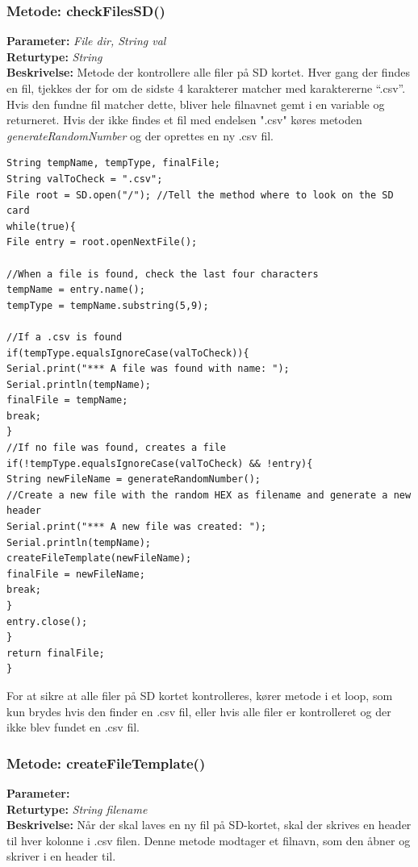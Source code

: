 \subsubsection{Metode: checkFilesSD()} \label{title:checkFiles}
\textbf{Parameter: } \textit{File dir, String val}
\\ \textbf{Returtype: } \textit{String}
\\ \textbf{Beskrivelse: }  Metode der kontrollere alle filer på SD kortet. Hver gang der findes en fil, tjekkes der for om de sidste 4 karakterer matcher med karaktererne “.csv”. Hvis den fundne fil matcher dette, bliver hele filnavnet gemt i en variable og returneret. Hvis der ikke findes et fil med endelsen ".csv" køres metoden \textit{generateRandomNumber} og der oprettes en ny .csv fil. 
\begin{lstlisting}
String tempName, tempType, finalFile;
String valToCheck = ".csv";
File root = SD.open("/"); //Tell the method where to look on the SD card
while(true){
File entry = root.openNextFile();

//When a file is found, check the last four characters
tempName = entry.name();
tempType = tempName.substring(5,9);

//If a .csv is found
if(tempType.equalsIgnoreCase(valToCheck)){
Serial.print("*** A file was found with name: "); Serial.println(tempName);
finalFile = tempName;
break;
}
//If no file was found, creates a file
if(!tempType.equalsIgnoreCase(valToCheck) && !entry){
String newFileName = generateRandomNumber();
//Create a new file with the random HEX as filename and generate a new header
Serial.print("*** A new file was created: "); Serial.println(tempName);
createFileTemplate(newFileName);
finalFile = newFileName;
break;
}
entry.close();
}
return finalFile;
}
\end{lstlisting}
For at sikre at alle filer på SD kortet kontrolleres, kører metode i et loop, som kun brydes hvis den finder en .csv fil, eller hvis alle filer er kontrolleret og der ikke blev fundet en .csv fil. 

\subsubsection{Metode: createFileTemplate()} \label{title:createTemplate}
\textbf{Parameter: } \textit{}
\\ \textbf{Returtype: } \textit{String filename}
\\ \textbf{Beskrivelse: }  Når der skal laves en ny fil på SD-kortet, skal der skrives en header til hver kolonne i .csv filen. Denne metode modtager et filnavn, som den åbner og skriver i en header til. 

